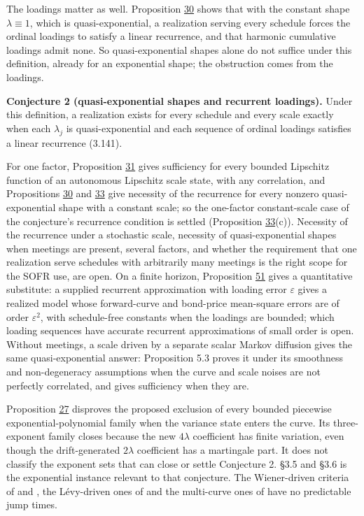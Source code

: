 \documentclass[11pt]{article}
\begin{document}
The loadings matter as well. Proposition \hyperref[res:Proposition-30]{30} shows that with the constant shape \(\lambda\equiv1\), which is quasi-exponential, a realization serving every schedule forces the ordinal loadings to satisfy a linear recurrence, and that harmonic cumulative loadings admit none. So quasi-exponential shapes alone do not suffice under this definition, already for an exponential shape; the obstruction comes from the loadings.

\textbf{Conjecture 2 (quasi-exponential shapes and recurrent loadings).} Under this definition, a realization exists for every schedule and every scale exactly when each \(\lambda_j\) is quasi-exponential and each sequence of ordinal loadings satisfies a linear recurrence (3.141).

For one factor, Proposition \hyperref[res:Proposition-31]{31} gives sufficiency for every bounded Lipschitz function of an autonomous Lipschitz scale state, with any correlation, and Propositions \hyperref[res:Proposition-30]{30} and \hyperref[res:Proposition-33]{33} give necessity of the recurrence for every nonzero quasi-exponential shape with a constant scale; so the one-factor constant-scale case of the conjecture's recurrence condition is settled (Proposition \hyperref[res:Proposition-33]{33}(c)). Necessity of the recurrence under a stochastic scale, necessity of quasi-exponential shapes when meetings are present, several factors, and whether the requirement that one realization serve schedules with arbitrarily many meetings is the right scope for the SOFR use, are open. On a finite horizon, Proposition \hyperref[res:Proposition-51]{51} gives a quantitative substitute: a supplied recurrent approximation with loading error \(\varepsilon\) gives a realized model whose forward-curve and bond-price mean-square errors are of order \(\varepsilon^2\), with schedule-free constants when the loadings are bounded; which loading sequences have accurate recurrent approximations of small order is open. Without meetings, a scale driven by a separate scalar Markov diffusion gives the same quasi-exponential answer: \cite{bjork2004finite} Proposition 5.3 proves it under its smoothness and non-degeneracy assumptions when the curve and scale noises are not perfectly correlated, and gives sufficiency when they are.

Proposition \hyperref[res:Proposition-27]{27} disproves the proposed exclusion of every bounded piecewise exponential-polynomial family when the variance state enters the curve. Its three-exponent family closes because the new \(4\lambda\) coefficient has finite variation, even though the drift-generated \(2\lambda\) coefficient has a martingale part. It does not classify the exponent sets that can close or settle Conjecture 2. \cite{brace2024sofr} §3.5 and §3.6 is the exponential instance relevant to that conjecture. The Wiener-driven criteria of \cite{bjork2001existence} and \cite{tappe2010alternative}, the Lévy-driven ones of \cite{tappe2012existence} and the multi-curve ones of \cite{fontana2024geometry} have no predictable jump times.
\end{document}
